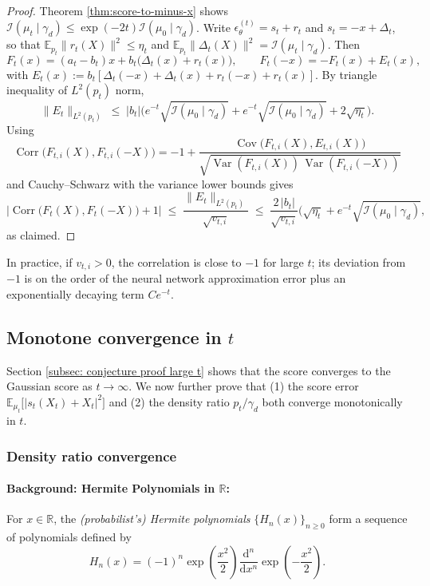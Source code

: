 \documentclass[12pt]{article}
\newcommand{\0}{\mathbf{0}}
\newcommand{\diff}{\mathrm{d}}
\DeclareMathOperator{\Cov}{Cov}
\DeclareMathOperator{\Corr}{Corr}
\DeclareMathOperator{\Var}{Var}
\newcommand{\R}{\mathbb{R}}
\newcommand{\E}{\mathbb{E}}
\newcommand{\FI}{\mathcal{I}}  %
\begin{document}
\begin{proof}
Theorem \ref{thm:score-to-minus-x} shows $\FI(\mu_t\mid\gamma_d)\leq \exp(-2t)\FI(\mu_0\mid\gamma_d)$.  Write $\epsilon^{(t)}_\theta=s_t+r_t$ and $s_t=-x+\Delta_t$, so that
$\mathbb{E}_{p_t}\|r_t(X)\|^2 \leq \eta_t$ and $\mathbb{E}_{p_t}\|\Delta_t(X)\|^2=\FI(\mu_t\mid\gamma_d)$.
Then
\[
F_t(x)=(a_t-b_t)x+b_t\bigl(\Delta_t(x)+r_t(x)\bigr),
\qquad
F_t(-x)=-F_t(x)+E_t(x),
\]
with
$E_t(x):=b_t\!\left[\Delta_t(-x)+\Delta_t(x)+r_t(-x)+r_t(x)\right]$.
By triangle inequality of $L^2(p_t)$ norm, 
\[
\|E_t\|_{L^2(p_t)}\;\le\;|b_t|\bigl(e^{-t}\sqrt{\FI(\mu_0\mid\gamma_d)}+ e^{-t}\sqrt{\FI(\mu_0\mid\gamma_d)} + 2\sqrt{\eta_t}\bigr).
\]
Using
\[
\Corr\bigl(F_{t,i}(X),F_{t,i}(-X)\bigr)
= -1+\frac{\Cov\bigl(F_{t,i}(X),E_{t,i}(X)\bigr)}{\sqrt{\Var(F_{t,i}(X))\,\Var(F_{t,i}(-X))}}
\]
and Cauchy--Schwarz with the variance lower bounds gives
\[
\bigl|\Corr\bigl(F_t(X),F_t(-X)\bigr)+1\bigr|
\;\le\; \frac{\|E_t\|_{L^2(p_t)}}{\sqrt{v_{t,i}}}
\;\le\; \frac{2\,|b_t|}{\sqrt{v_{t,i}}}\bigl(\sqrt{\eta_t}+e^{-t}\sqrt{\FI(\mu_0\mid\gamma_d)},
\]
as claimed.
\end{proof}
In practice, if $v_{t,i}>0$, the correlation is close to $-1$ for large $t$; its deviation from $-1$ is on the order of the neural network approximation error plus an exponentially decaying term $C e^{-t}$.


\subsection{Monotone convergence in $t$}\label{subsec: monotone convergence}

Section \ref{subsec: conjecture proof large t} shows that the score converges to the Gaussian score as $t \to \infty$. We now further prove that (1) the score error $\E_{\mu_t}\bigl[|s_t(X_t) + X_t|^2\bigr]$ and (2) the density ratio $p_t/\gamma_d$ both converge monotonically in $t$. 

\subsubsection{Density ratio convergence}
\paragraph{Background: Hermite Polynomials in $\R$:} 


For $x\in\R$, the \emph{(probabilist's) Hermite polynomials}
$\{H_n(x)\}_{n\ge0}$ form a sequence of polynomials defined by
$$
H_n(x) = (-1)^n \exp\left(\frac{x^2}{2}\right)\frac{\diff^n}{\diff x^n} \exp\left(-\frac{x^2}{2}\right).
$$
\end{document}
